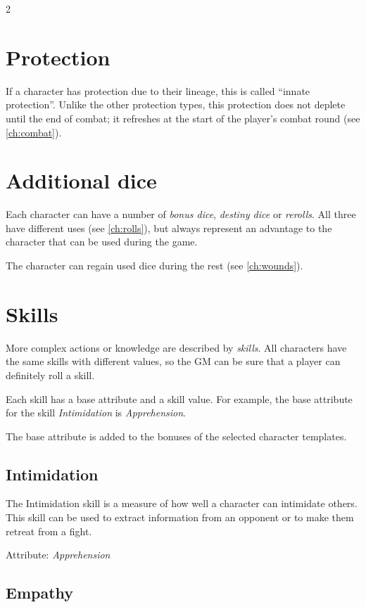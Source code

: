 \begin{multicols}{2}
\section{Protection}

If a character has protection due to their lineage, this is called ``innate protection''. Unlike the other protection types, this protection does not deplete until the end of combat; it refreshes at the start of the player's combat round (see \cref{ch:combat}).

\section{Additional dice}

Each character can have a number of \textit{bonus dice}, \textit{destiny dice} or \textit{rerolls}. All three have different uses (see \cref{ch:rolls}), but always represent an advantage to the character that can be used during the game.

The character can regain used dice during the rest (see \cref{ch:wounds}).

\section{Skills}

More complex actions or knowledge are described by \textit{skills}. All characters have the same skills with different values, so the GM can be sure that a player can definitely roll a skill.

Each skill has a base attribute and a skill value. For example, the base attribute for the skill \textit{Intimidation} is \textit{Apprehension}.

The base attribute is added to the bonuses of the selected character templates.

\subsection{Intimidation}

The Intimidation skill is a measure of how well a character can intimidate others. This skill can be used to extract information from an opponent or to make them retreat from a fight.

Attribute: \textit{Apprehension}

\subsection{Empathy}


\end{multicols}

